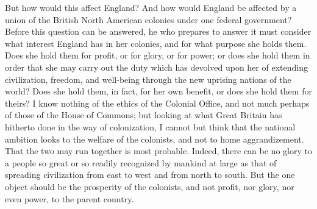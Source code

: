 But how would this affect England?  And how would England be
affected by a union of the British North American colonies under
one federal government?  Before this question can be answered, he
who prepares to answer it must consider what interest England has
in her colonies, and for what purpose she holds them.  Does she
hold them for profit, or for glory, or for power; or does she hold
them in order that she may carry out the duty which has devolved
upon her of extending civilization, freedom, and well-being through
the new uprising nations of the world?  Does she hold them, in
fact, for her own benefit, or does she hold them for theirs?  I
know nothing of the ethics of the Colonial Office, and not much
perhaps of those of the House of Commons; but looking at what Great
Britain has hitherto done in the way of colonization, I cannot but
think that the national ambition looks to the welfare of the
colonists, and not to home aggrandizement.  That the two may run
together is most probable.  Indeed, there can be no glory to a
people so great or so readily recognized by mankind at large as
that of spreading civilization from east to west and from north to
south.  But the one object should be the prosperity of the
colonists, and not profit, nor glory, nor even power, to the parent
country.

